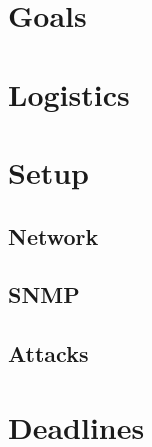 \documentclass[11pt]{article}
\begin{document}
\section{Goals}

\section{Logistics}

\section{Setup}

\subsection{Network}

\subsection{SNMP}

\subsection{Attacks}

\section{Deadlines}
\end{document}
